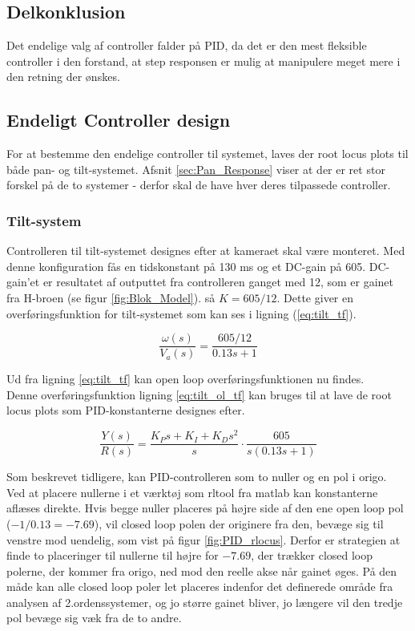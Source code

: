 \subsection{Delkonklusion}

Det endelige valg af controller falder på PID, da det er den mest fleksible controller i den forstand, at step responsen er mulig at manipulere meget mere i den retning der ønskes.

\subsection{Endeligt Controller design}

For at bestemme den endelige controller til systemet, laves der root locus plots til både pan- og tilt-systemet. Afsnit \ref{sec:Pan_Response} viser at der er ret stor forskel på de to systemer - derfor skal de have hver deres tilpassede controller.

\subsubsection{Tilt-system}

Controlleren til tilt-systemet designes efter at kameraet skal være monteret. Med denne konfiguration fås en tidskonstant på 130 ms og et DC-gain på 605. DC-gain'et er resultatet af outputtet fra controlleren ganget med 12, som er gainet fra H-broen (se figur \ref{fig:Blok_Model}). så $K=605/12$. Dette giver en overføringsfunktion for tilt-systemet som kan ses i ligning (\ref{eq:tilt_tf}). 

\begin{equation}\label{eq:tilt_tf}
\frac{\omega(s)}{V_{a}(s)}=\frac{605/12}{0.13s+1}
\end{equation}

Ud fra ligning \ref{eq:tilt_tf} kan open loop overføringsfunktionen nu findes.\\ Denne overføringsfunktion ligning \eqref{eq:tilt_ol_tf} kan bruges til at lave de root locus plots som PID-konstanterne designes efter.

\begin{equation}\label{eq:tilt_ol_tf}
\frac{Y(s)}{R(s)}=\frac{K_{P}s+K_{I}+K_{D}s^2}{s}\cdot\frac{605}{s(0.13s+1)}
\end{equation}

Som beskrevet tidligere, kan PID-controlleren som to nuller og en pol i origo.\\ Ved at placere nullerne i et værktøj som rltool fra matlab kan konstanterne aflæses direkte. Hvis begge nuller placeres på højre side af den ene open loop pol ($-1/0.13=-7.69$), vil closed loop polen der originere fra den, bevæge sig til venstre mod uendelig, som vist på figur \ref{fig:PID_rlocus}. Derfor er strategien at finde to placeringer til nullerne til højre for $-7.69$, der trækker closed loop polerne, der kommer fra origo, ned mod den reelle akse når gainet øges. På den måde kan alle closed loop poler let placeres indenfor det definerede område fra analysen af 2.ordenssystemer, og jo større gainet bliver, jo længere vil den tredje pol bevæge sig væk fra de to andre.

